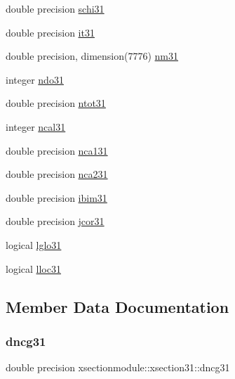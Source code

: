 \begin{DoxyCompactItemize}
\item 
double precision \hyperlink{structxsectionmodule_1_1xsection31_a153de4453df9b1eeff9edde2042e9ab2}{schi31}
\item 
double precision \hyperlink{structxsectionmodule_1_1xsection31_a68383f51ddd329311862e3c48d3afb9a}{it31}
\item 
double precision, dimension(7776) \hyperlink{structxsectionmodule_1_1xsection31_a1c26d24d3ab344d6632795ed0c9be821}{nm31}
\item 
integer \hyperlink{structxsectionmodule_1_1xsection31_a9addddb2a5e2f3f5a907aa186304e48c}{ndo31}
\item 
double precision \hyperlink{structxsectionmodule_1_1xsection31_aa5407bf9df92ff92890c6427c9f909fa}{ntot31}
\item 
integer \hyperlink{structxsectionmodule_1_1xsection31_aae539e4a64dc2dd160cadf000a69d022}{ncal31}
\item 
double precision \hyperlink{structxsectionmodule_1_1xsection31_ab69efed5c4038071cc205727faad2625}{nca131}
\item 
double precision \hyperlink{structxsectionmodule_1_1xsection31_af7d1fe121a9ee6efa50eedc7f473a614}{nca231}
\item 
double precision \hyperlink{structxsectionmodule_1_1xsection31_a09d29d9f61ee2fd93e2e8b603b724c28}{ibim31}
\item 
double precision \hyperlink{structxsectionmodule_1_1xsection31_a8f909119c5b4bd3f03284e04ef0ba5a8}{jcor31}
\item 
logical \hyperlink{structxsectionmodule_1_1xsection31_a8d1fa85ef1232dd1c38e607be023b591}{lglo31}
\item 
logical \hyperlink{structxsectionmodule_1_1xsection31_a0a833730fa24835a4475b430046ccf90}{lloc31}
\end{DoxyCompactItemize}


\subsection{Member Data Documentation}
\mbox{\label{structxsectionmodule_1_1xsection31_a9b38a6dd13db59421dcb2086a12fb73e}} 
\subsubsection{\texorpdfstring{dncg31}{dncg31}}
{\footnotesize\ttfamily double precision xsectionmodule\+::xsection31\+::dncg31}

